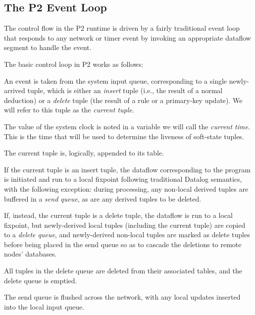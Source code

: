 \subsection{The P2 Event Loop}
\label{sec:eventloop}
The control flow in the P2 runtime is driven by a fairly traditional event loop that responds to any network or 
timer event by invoking an appropriate dataflow segment to handle the event.

The basic control loop in P2 works as follows:
\begin{CompactEnumerate}
    \item An event is taken from the system input queue, corresponding to a single newly-arrived tuple, which is either an {\em insert} tuple (i.e., the result of a normal deduction) or a {\em delete} tuple (the result of a  rule or a primary-key update).  We will refer to this tuple as the {\em current tuple}.
    \item The value of the system clock is noted in a variable we will call the {\em current time}.  This is the time that will be used to determine the liveness of soft-state tuples.  
    \item The current tuple is, logically, appended to its table.
    \item If the current tuple is an insert tuple, the dataflow corresponding to the \OVERLOG program is initiated and run to a local fixpoint following traditional Datalog semantics, with the following exception: during processing, any non-local derived tuples are buffered in a {\em send queue}, as are any derived tuples to be deleted.
    \item If, instead, the current tuple is a delete tuple, the dataflow
    is run to a local fixpoint, but newly-derived local tuples
    (including the current tuple) are copied to a {\em delete queue},
    and newly-derived non-local tuples are marked as delete tuples
    before being placed in the send queue so as to cascade the deletions
    to remote nodes' databases.
    \item All tuples in the delete queue are deleted from their associated tables, and the delete queue is emptied.
    \item The send queue is flushed across the network, with any local updates inserted into the local input queue.
\end{CompactEnumerate}

